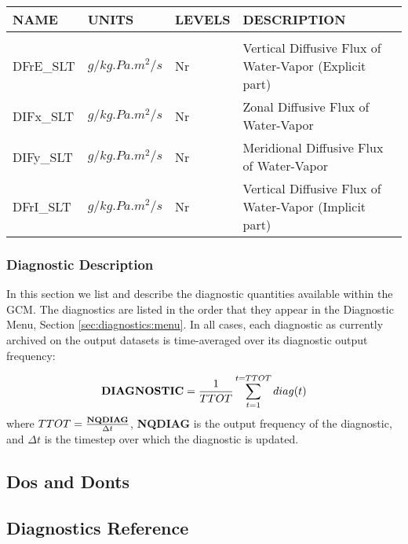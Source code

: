 \newpage
\vspace*{\fill}
\begin{tabular}{llll}
\hline\hline
 NAME & UNITS & LEVELS & DESCRIPTION \\
\hline

&\\
 DFrE\_SLT & $g/kg.Pa.m^2/s$ & Nr 
         &\begin{minipage}[t]{3in}
          {Vertical Diffusive Flux of Water-Vapor (Explicit part)}
         \end{minipage}\\
 DIFx\_SLT & $g/kg.Pa.m^2/s$ & Nr 
         &\begin{minipage}[t]{3in}
          {Zonal      Diffusive Flux of Water-Vapor}
         \end{minipage}\\
 DIFy\_SLT & $g/kg.Pa.m^2/s$ & Nr 
         &\begin{minipage}[t]{3in}
          {Meridional Diffusive Flux of Water-Vapor}
         \end{minipage}\\
 DFrI\_SLT & $g/kg.Pa.m^2/s$ & Nr 
         &\begin{minipage}[t]{3in}
          {Vertical Diffusive Flux of Water-Vapor (Implicit part)}
         \end{minipage}\\
\end{tabular}
\vspace{1.5in}
\vfill

\newpage

\subsubsection{Diagnostic Description}

In this section we list and describe the diagnostic quantities available within the 
GCM.  The diagnostics are listed in the order that they appear in the 
Diagnostic Menu, Section \ref{sec:diagnostics:menu}.
In all cases, each diagnostic as currently archived on the output datasets
is time-averaged over its diagnostic output frequency:

\[
{\bf DIAGNOSTIC} = {1 \over TTOT} \sum_{t=1}^{t=TTOT} diag(t)
\]
where $TTOT = {{\bf NQDIAG} \over \Delta t}$, {\bf NQDIAG} is the 
output frequency of the diagnostic, and $\Delta t$ is
the timestep over which the diagnostic is updated.  

\subsection{Dos and Donts}

\subsection{Diagnostics Reference}

